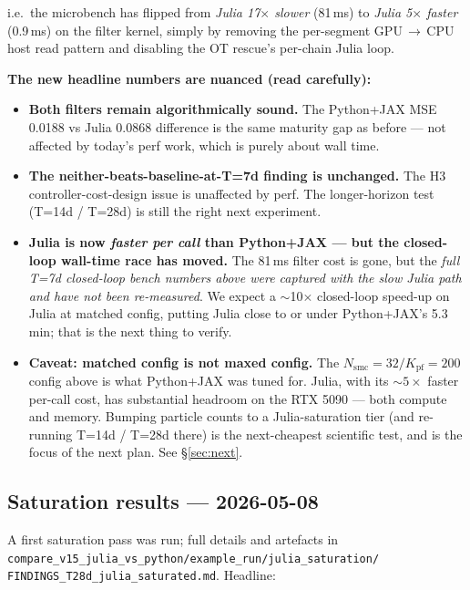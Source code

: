 \documentclass[11pt,a4paper]{article}
\begin{document}
i.e.\ the microbench has flipped from \emph{Julia 17$\times$ slower}
(81\,ms) to \emph{Julia 5$\times$ faster} (0.9\,ms) on the filter
kernel, simply by removing the per-segment GPU\,$\to$\,CPU host
read pattern and disabling the OT rescue's per-chain Julia loop.

\textbf{The new headline numbers are nuanced (read carefully):}

\begin{itemize}[itemsep=2pt]
  \item \textbf{Both filters remain algorithmically sound.} The
        Python+JAX MSE 0.0188 vs Julia 0.0868 difference is the
        same maturity gap as before --- not affected by today's
        perf work, which is purely about wall time.
  \item \textbf{The neither-beats-baseline-at-T=7d finding is
        unchanged.} The H3 controller-cost-design issue is
        unaffected by perf. The longer-horizon test (T=14d / T=28d)
        is still the right next experiment.
  \item \textbf{Julia is now \emph{faster per call} than Python+JAX
        --- but the closed-loop wall-time race has moved.} The
        81\,ms filter cost is gone, but the \emph{full T=7d
        closed-loop bench numbers above were captured with the
        slow Julia path and have not been re-measured}. We expect
        a $\sim$10$\times$ closed-loop speed-up on Julia at
        matched config, putting Julia close to or under Python+JAX's
        5.3\,min; that is the next thing to verify.
  \item \textbf{Caveat: matched config is not maxed config.} The
        $N_{\text{smc}}=32 / K_{\text{pf}}=200$ config above is
        what Python+JAX was tuned for. Julia, with its
        $\sim 5\times$ faster per-call cost, has substantial
        headroom on the RTX 5090 --- both compute and memory.
        Bumping particle counts to a Julia-saturation tier (and
        re-running T=14d / T=28d there) is the next-cheapest
        scientific test, and is the focus of the next plan.
        See \S\ref{sec:next}.
\end{itemize}

\subsection{Saturation results --- 2026-05-08}

A first saturation pass was run; full details and artefacts in
\texttt{compare\_v15\_julia\_vs\_python/example\_run/julia\_saturation/}
\texttt{FINDINGS\_T28d\_julia\_saturated.md}. Headline:
\end{document}
